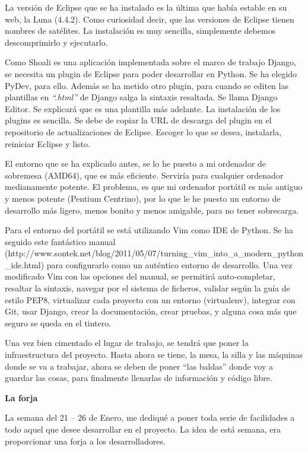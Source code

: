 \documentclass[a4paper, 12pt]{book}
\begin{document}
La versión de Eclipse que se ha instalado es la última que había estable en su 
web, la Luna (4.4.2). Como curiosidad decir, que las versiones de Eclipse tienen 
nombres de satélites. La instalación es muy sencilla, simplemente debemos 
descomprimirlo y ejecutarlo.

Como Shoali es una aplicación implementada sobre el marco de trabajo Django, 
se necesita un plugin de Eclipse para poder desarrollar en Python. Se ha elegido 
PyDev, para ello. Además se ha metido otro plugin, para cuando se editen las 
plantillas en \textit{``.html''} de Django salga la sintaxis resaltada. Se llama 
Django Editor. Se explicará que es una plantilla más adelante. La instalación 
de los plugins es sencilla. Se debe de copiar la URL de descarga del plugin en 
el repositorio de actualizaciones de Eclipse. Escoger lo que se desea, 
instalarla, reiniciar Eclipse y listo.

El entorno que se ha explicado antes, se lo he puesto a mi ordenador de 
sobremesa (AMD64), que es más eficiente. Serviría para cualquier ordenador 
medianamente potente. El problema, es que mi ordenador portátil es más antiguo 
y menos potente (Pentium Centrino), por lo que le he puesto un entorno de 
desarrollo más ligero, menos bonito y menos amigable, para no tener sobrecarga.

Para el entorno del portátil se está utilizando Vim como IDE de Python. Se ha 
seguido este fantástico manual (http://www.sontek.net/blog/2011/05/07/turning_vim_into_a_modern_python_ide.html) 
para configurarlo como un auténtico entorno de desarrollo. Una vez modificado 
Vim con las opciones del manual, se permitirá auto-completar, resaltar la 
sintaxis, navegar por el sistema de ficheros, validar según la guía de estilo 
PEP8, virtualizar cada proyecto con un entorno (virtualenv), integrar con Git, 
usar Django, crear la documentación, crear pruebas, y alguna cosa más que 
seguro se queda en el tintero.

Una vez bien cimentado el lugar de trabajo, se tendrá que poner la 
infraestructura del proyecto. Hasta ahora se tiene, la mesa, la silla y las 
máquinas donde se va a trabajar, ahora se deben de poner ``las baldas'' donde 
voy a guardar las cosas, para finalmente llenarlas de información y código libre.

\textbf{La forja}

La semana del 21 – 26 de Enero, me dediqué a poner toda serie de facilidades a todo aquel que desee desarrollar en el proyecto. La idea de está semana, era proporcionar una forja a los desarrolladores.
\end{document}

